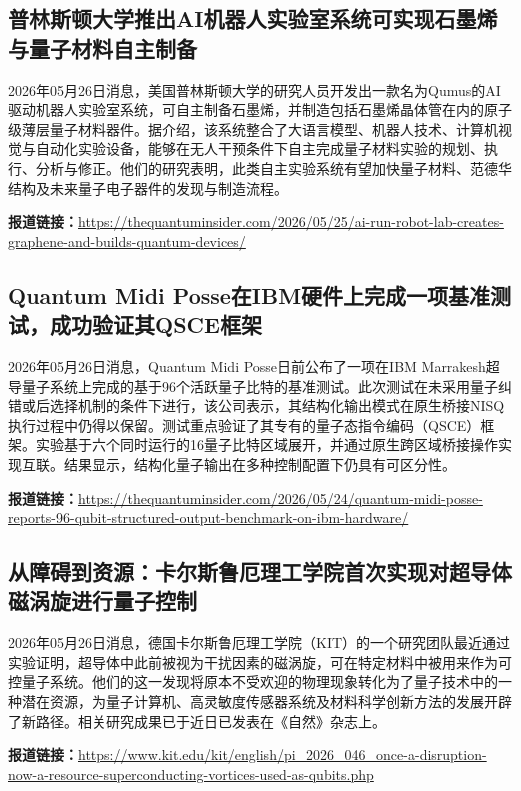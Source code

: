 \documentclass[12pt,a4paper]{ctexart}
\begin{document}
\subsection{ 普林斯顿大学推出AI机器人实验室系统可实现石墨烯与量子材料自主制备 }

2026年05月26日消息，美国普林斯顿大学的研究人员开发出一款名为Qumus的AI驱动机器人实验室系统，可自主制备石墨烯，并制造包括石墨烯晶体管在内的原子级薄层量子材料器件。据介绍，该系统整合了大语言模型、机器人技术、计算机视觉与自动化实验设备，能够在无人干预条件下自主完成量子材料实验的规划、执行、分析与修正。他们的研究表明，此类自主实验系统有望加快量子材料、范德华结构及未来量子电子器件的发现与制造流程。

\noindent\textbf{报道链接：}\url{https://thequantuminsider.com/2026/05/25/ai-run-robot-lab-creates-graphene-and-builds-quantum-devices/ }

\subsection{ Quantum Midi Posse在IBM硬件上完成一项基准测试，成功验证其QSCE框架 }

2026年05月26日消息，Quantum Midi Posse日前公布了一项在IBM Marrakesh超导量子系统上完成的基于96个活跃量子比特的基准测试。此次测试在未采用量子纠错或后选择机制的条件下进行，该公司表示，其结构化输出模式在原生桥接NISQ执行过程中仍得以保留。测试重点验证了其专有的量子态指令编码（QSCE）框架。实验基于六个同时运行的16量子比特区域展开，并通过原生跨区域桥接操作实现互联。结果显示，结构化量子输出在多种控制配置下仍具有可区分性。

\noindent\textbf{报道链接：}\url{https://thequantuminsider.com/2026/05/24/quantum-midi-posse-reports-96-qubit-structured-output-benchmark-on-ibm-hardware/ }

\subsection{ 从障碍到资源：卡尔斯鲁厄理工学院首次实现对超导体磁涡旋进行量子控制 }

2026年05月26日消息，德国卡尔斯鲁厄理工学院（KIT）的一个研究团队最近通过实验证明，超导体中此前被视为干扰因素的磁涡旋，可在特定材料中被用来作为可控量子系统。他们的这一发现将原本不受欢迎的物理现象转化为了量子技术中的一种潜在资源，为量子计算机、高灵敏度传感器系统及材料科学创新方法的发展开辟了新路径。相关研究成果已于近日已发表在《自然》杂志上。

\noindent\textbf{报道链接：}\url{https://www.kit.edu/kit/english/pi\_2026\_046\_once-a-disruption-now-a-resource-superconducting-vortices-used-as-qubits.php }
\end{document}
